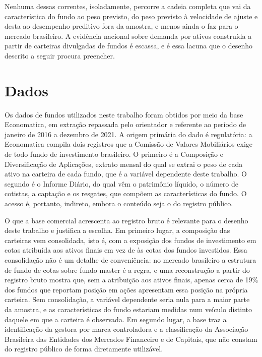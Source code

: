 \documentclass[12pt,a4paper]{article}
\begin{document}
Nenhuma dessas correntes, isoladamente, percorre a cadeia completa que vai da característica
do fundo ao peso previsto, do peso previsto à velocidade de ajuste e desta ao desempenho
preditivo fora da amostra, e menos ainda o faz para o mercado brasileiro. A evidência
nacional sobre demanda por ativos construída a partir de carteiras divulgadas de fundos é
escassa, e é essa lacuna que o desenho descrito a seguir procura preencher.

\clearpage
\section{Dados}
\label{sec:dados}

Os dados de fundos utilizados neste trabalho foram obtidos por meio da base Economatica, em
extração repassada pelo orientador e referente ao período de janeiro de 2016 a dezembro de
2021. A origem primária do dado é regulatória: a Economatica compila dois registros que a
Comissão de Valores Mobiliários exige de todo fundo de investimento brasileiro. O primeiro é
a Composição e Diversificação de Aplicações, extrato mensal do qual se extrai o peso de cada
ativo na carteira de cada fundo, que é a variável dependente deste trabalho. O segundo é o
Informe Diário, do qual vêm o patrimônio líquido, o número de cotistas, a captação e os
resgates, que compõem as características do fundo. O acesso é, portanto, indireto, embora o
conteúdo seja o do registro público.

O que a base comercial acrescenta ao registro bruto é relevante para o desenho deste
trabalho e justifica a escolha. Em primeiro lugar, a composição das carteiras vem
consolidada, isto é, com a exposição dos fundos de investimento em cotas atribuída aos
ativos finais em vez de às cotas dos fundos investidos. Essa consolidação não é um detalhe de
conveniência: no mercado brasileiro a estrutura de fundo de cotas sobre fundo master é a
regra, e uma reconstrução a partir do registro bruto mostra que, sem a atribuição aos ativos
finais, apenas cerca de 19\% dos fundos que reportam posição em ações apresentam essa posição
na própria carteira. Sem consolidação, a variável dependente seria nula para a maior parte da
amostra, e as características do fundo estariam medidas num veículo distinto daquele em que a
carteira é observada. Em segundo lugar, a base traz a identificação da gestora por marca
controladora e a classificação da Associação Brasileira das Entidades dos Mercados Financeiro
e de Capitais, que não constam do registro público de forma diretamente utilizável.
\end{document}
